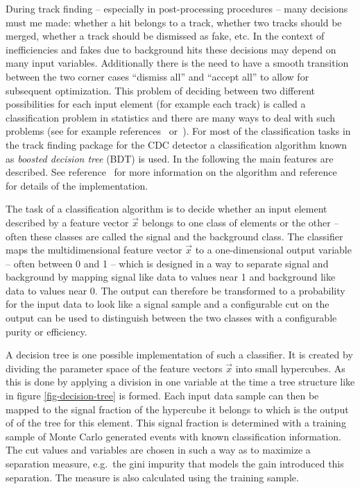 During track finding -- especially in post-processing procedures -- many decisions must me made: whether a hit belongs to a track, whether two tracks should be merged, whether a track should be dismissed as fake, etc. In the context of inefficiencies and fakes due to background hits these decisions may depend on many input variables. Additionally there is the need to have a smooth transition between the two corner cases ``dismiss all'' and ``accept all'' to allow for subsequent optimization. This problem of deciding between two different possibilities for each input element (for example each track) is called a classification problem in statistics and there are many ways to deal with such problems (see for example references~\cite{cowan} or~\cite{blobel}). For most of the classification tasks in the track finding package for the CDC detector a classification algorithm known as \emph{boosted decision tree} (BDT) is used. In the following the main features are described. See reference~\cite{friedman} for more information on the algorithm and reference~\cite{keck} for details of the implementation.

The task of a classification algorithm is to decide whether an input element described by a feature vector $\vec x$ belongs to one class of elements or the other -- often these classes are called the signal and the background class. The classifier maps the multidimensional feature vector $\vec x$ to a one-dimensional output variable -- often between 0 and 1 -- which is designed in a way to separate signal and background by mapping signal like data to values near 1 and background like data to values near 0. The output can therefore be transformed to a probability for the input data to look like a signal sample and a configurable cut on the output can be used to distinguish between the two classes with a configurable purity or efficiency.

A decision tree is one possible implementation of such a classifier. It is created by dividing the parameter space of the feature vectors $\vec x$ into small hypercubes. As this is done by applying a division in one variable at the time a tree structure like in figure \ref{fig-decision-tree} is formed. Each input data sample can then be mapped to the signal fraction of the hypercube it belongs to which is the output of of the tree for this element. This signal fraction is determined with a training sample of Monte Carlo generated events with known classification information. The cut values and variables are chosen in such a way as to maximize a separation measure, e.g.\ the gini impurity that models the gain introduced this separation. The measure is also calculated using the training sample.

